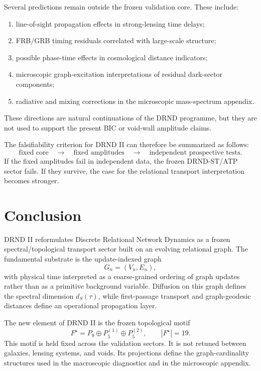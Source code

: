 \documentclass[12pt]{iopart}
\begin{document}
Several predictions remain outside the frozen validation core. These include:
\begin{enumerate}
    \item line-of-sight propagation effects in strong-lensing time delays;
    \item FRB/GRB timing residuals correlated with large-scale structure;
    \item possible phase-time effects in cosmological distance indicators;
    \item microscopic graph-excitation interpretations of residual dark-sector components;
    \item radiative and mixing corrections in the microscopic mass-spectrum appendix.
\end{enumerate}
These directions are natural continuations of the DRND programme, but they are not used to support the present BIC or void-wall amplitude claims.

The falsifiability criterion for DRND II can therefore be summarized as follows:
\begin{equation}
\textrm{fixed core} \quad \longrightarrow \quad
\textrm{fixed amplitudes} \quad \longrightarrow \quad
\textrm{independent prospective tests}.
\end{equation}
If the fixed amplitudes fail in independent data, the frozen DRND-ST/ATP sector fails. If they survive, the case for the relational transport interpretation becomes stronger.

\section{Conclusion}
\label{sec:conclusion}

DRND II reformulates Discrete Relational Network Dynamics as a frozen spectral/topological transport sector built on an evolving relational graph. The fundamental substrate is the update-indexed graph
\begin{equation}
G_n=(V_n,E_n),
\end{equation}
with physical time interpreted as a coarse-grained ordering of graph updates rather than as a primitive background variable. Diffusion on this graph defines the spectral dimension \(d_S(\tau)\), while first-passage transport and graph-geodesic distances define an operational propagation layer.

The new element of DRND II is the frozen topological motif
\begin{equation}
F^\star=P_9\oplus P_5^{(1)}\oplus P_5^{(2)},
\qquad |F^\star|=19.
\end{equation}
This motif is held fixed across the validation sectors. It is not retuned between galaxies, lensing systems, and voids. Its projections define the graph-cardinality structures used in the macroscopic diagnostics and in the microscopic appendix.
\end{document}
